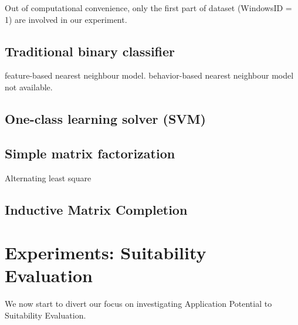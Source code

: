 \documentclass{article} %
\begin{document}
Out of computational convenience, only the first part of dataset (WindowsID =
1) are involved in our experiment.



\subsection{Traditional binary classifier}
feature-based nearest neighbour model. behavior-based nearest neighbour model
not available.

\subsection{One-class learning solver (SVM)}

\subsection{Simple matrix factorization}
Alternating least square

\subsection{Inductive Matrix Completion}


\section{Experiments: Suitability Evaluation}
We now start to divert our focus on investigating Application Potential to
Suitability Evaluation.

{}

\end{document}
